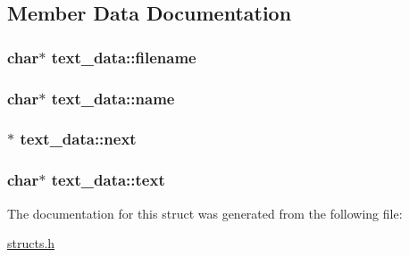 \subsection{Member Data Documentation}
\hypertarget{structtext__data_ab5ba1f2ba85ead4797f8d96eaec6ecc6}{
\subsubsection[{filename}]{\setlength{\rightskip}{0pt plus 5cm}char$\ast$ text\-\_\-data\-::filename}}\label{structtext__data_ab5ba1f2ba85ead4797f8d96eaec6ecc6}
\hypertarget{structtext__data_a3f5426e1540802213102e386ce97bbf0}{
\subsubsection[{name}]{\setlength{\rightskip}{0pt plus 5cm}char$\ast$ text\-\_\-data\-::name}}\label{structtext__data_a3f5426e1540802213102e386ce97bbf0}
\hypertarget{structtext__data_a8f86e505ae21c67e5fb2212a1f7fc0f4}{
\subsubsection[{next}]{$\ast$ text\-\_\-data\-::next}}\label{structtext__data_a8f86e505ae21c67e5fb2212a1f7fc0f4}
\hypertarget{structtext__data_a2fac5a089d89f9333afef2c7ec68d1c4}{
\subsubsection[{text}]{\setlength{\rightskip}{0pt plus 5cm}char$\ast$ text\-\_\-data\-::text}}\label{structtext__data_a2fac5a089d89f9333afef2c7ec68d1c4}


The documentation for this struct was generated from the following file\-:\begin{DoxyCompactItemize}
\item 
\hyperlink{structs_8h}{structs.\-h}\end{DoxyCompactItemize}
